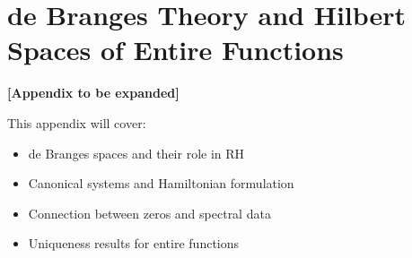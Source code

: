 \section{de Branges Theory and Hilbert Spaces of Entire Functions}
\label{app:debranges}

\textbf{[Appendix to be expanded]}

This appendix will cover:
\begin{itemize}
\item de Branges spaces and their role in RH
\item Canonical systems and Hamiltonian formulation
\item Connection between zeros and spectral data
\item Uniqueness results for entire functions
\end{itemize}
